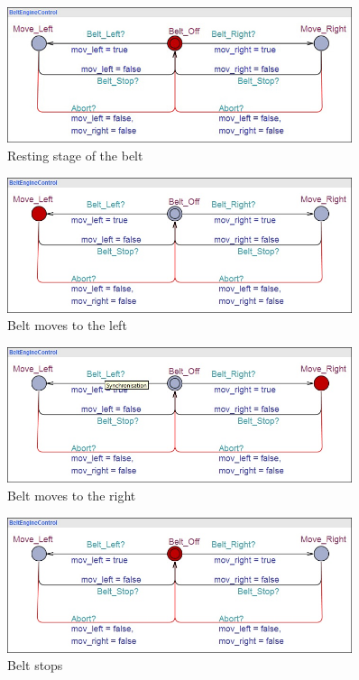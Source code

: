 \documentclass[a4paper,oneside,11pt]{report}
\begin{document}
\begin{figure}
\centering
\includegraphics[width=0.9\textwidth]{images/belt1.jpg}
\caption{Resting stage of the belt}
\label{fig:belt1}
\end{figure}

\begin{figure}
\centering
\includegraphics[width=0.9\textwidth]{images/belt2.jpg}
\caption{Belt moves to the left}
\label{fig:belt2}
\end{figure}

\begin{figure}
\centering
\includegraphics[width=0.9\textwidth]{images/belt3.jpg}
\caption{Belt moves to the right}
\label{fig:belt3}
\end{figure}

\begin{figure}
\centering
\includegraphics[width=0.9\textwidth]{images/belt4.jpg}
\caption{Belt stops}
\label{fig:belt4}
\end{figure}
\end{document}
